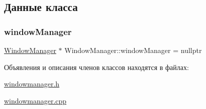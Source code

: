 \subsection{Данные класса}
\mbox{\label{class_window_manager_aeac5c58442c8ec0caff4bdb96660d2d6}} 
\subsubsection{\texorpdfstring{window\+Manager}{windowManager}}
{\footnotesize\ttfamily \hyperlink{class_window_manager}{Window\+Manager} $\ast$ Window\+Manager\+::window\+Manager = nullptr\hspace{0.3cm}{\ttfamily [static]}}



Объявления и описания членов классов находятся в файлах\+:\begin{DoxyCompactItemize}
\item 
\hyperlink{windowmanager_8h}{windowmanager.\+h}\item 
\hyperlink{windowmanager_8cpp}{windowmanager.\+cpp}\end{DoxyCompactItemize}
